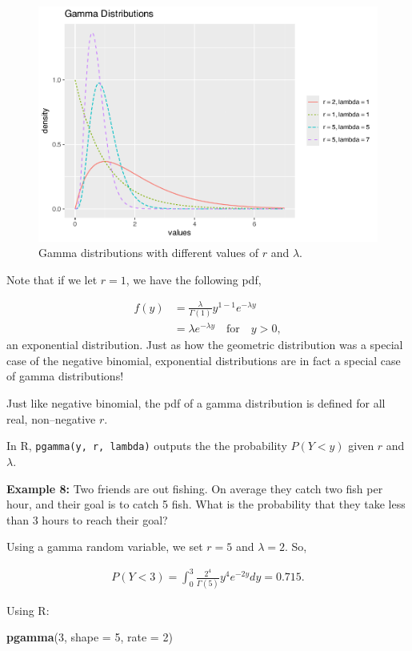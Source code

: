 \documentclass[
]{krantz}
\newenvironment{Shaded}{\begin{snugshade}}{\end{snugshade}}
\newcommand{\DataTypeTok}[1]{\textcolor[rgb]{0.27,0.27,0.27}{#1}}
\newcommand{\DecValTok}[1]{\textcolor[rgb]{0.06,0.06,0.06}{#1}}
\newcommand{\KeywordTok}[1]{\textcolor[rgb]{0.27,0.27,0.27}{\textbf{#1}}}
\newcommand{\NormalTok}[1]{#1}
\begin{document}
\begin{figure}

{\centering \includegraphics[width=0.6\linewidth]{bookdown-BeyondMLR_files/figure-latex/multGamma-1} 

}

\caption{Gamma distributions with different values of \(r\) and \(\lambda\).}\label{fig:multGamma}
\end{figure}

Note that if we let \(r = 1\), we have the following pdf,

\begin{align*}
 f(y) &= \frac{\lambda}{\Gamma(1)} y^{1-1} e^{-\lambda y} \\
      &= \lambda e^{-\lambda y} \quad \textrm{for} \quad y > 0,
\end{align*}
an exponential distribution. Just as how the geometric distribution was a special case of the negative binomial, exponential distributions are in fact a special case of gamma distributions!

Just like negative binomial, the pdf of a gamma distribution is defined for all real, non--negative \(r\).

In R, \texttt{pgamma(y,\ r,\ lambda)} outputs the the probability \(P(Y < y)\) given \(r\) and \(\lambda\).

\textbf{Example 8:} Two friends are out fishing. On average they catch two fish per hour, and their goal is to catch 5 fish. What is the probability that they take less than 3 hours to reach their goal?

Using a gamma random variable, we set \(r = 5\) and \(\lambda = 2\). So,

\begin{align*}
P(Y < 3) = \int_0^3 \frac{2^4}{\Gamma(5)} y^{4} e^{-2y}dy = 0.715.
\end{align*}

Using R:

\begin{Shaded}
\begin{Highlighting}[]
\KeywordTok{pgamma}\NormalTok{(}\DecValTok{3}\NormalTok{, }\DataTypeTok{shape =} \DecValTok{5}\NormalTok{, }\DataTypeTok{rate =} \DecValTok{2}\NormalTok{)}
\end{Highlighting}
\end{Shaded}
\end{document}
